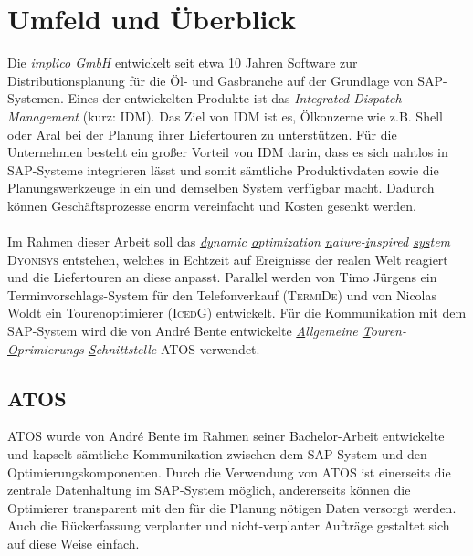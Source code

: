 \chapter{Umfeld und Überblick}
Die \emph{implico GmbH} entwickelt seit etwa 10 Jahren Software zur Distributionsplanung für die Öl- und Gasbranche auf der Grundlage von SAP-Systemen. Eines der entwickelten Produkte ist das \emph{Integrated Dispatch Management} (kurz: IDM). Das Ziel von IDM ist es, Ölkonzerne wie z.B. Shell oder Aral bei der Planung ihrer Liefertouren zu unterstützen. Für die Unternehmen besteht ein großer Vorteil von IDM darin, dass es sich nahtlos in SAP-Systeme integrieren lässt und somit sämtliche Produktivdaten sowie die Planungswerkzeuge in ein und demselben System verfügbar macht. Dadurch können Geschäftsprozesse enorm vereinfacht und Kosten gesenkt werden. \\
\\
Im Rahmen dieser Arbeit soll das \emph{\underline{dy}namic \underline{o}ptimization \underline{n}ature-\underline{i}nspired \underline{sys}tem} \textsc{Dyonisys} entstehen, welches in Echtzeit auf Ereignisse der realen Welt reagiert und die Liefertouren an diese anpasst. Parallel werden von Timo Jürgens ein Terminvorschlags-System für den Telefonverkauf (\textsc{TermiDe}) und von Nicolas Woldt ein Tourenoptimierer (\textsc{IcedG}) entwickelt. Für die Kommunikation mit dem SAP-System wird die von André Bente entwickelte \emph{\underline{A}llgemeine \underline{T}ouren-\underline{O}primierungs \underline{S}chnittstelle} \textsc{ATOS} verwendet.


\section{ATOS}
\textsc{ATOS} wurde von André Bente im Rahmen seiner Bachelor-Arbeit entwickelte und kapselt sämtliche Kommunikation zwischen dem SAP-System und den Optimierungskomponenten. Durch die Verwendung von \textsc{ATOS} ist einerseits die zentrale Datenhaltung im SAP-System möglich, andererseits können die Optimierer transparent mit den für die Planung nötigen Daten versorgt werden. Auch die Rückerfassung verplanter und nicht-verplanter Aufträge gestaltet sich auf diese Weise einfach.


